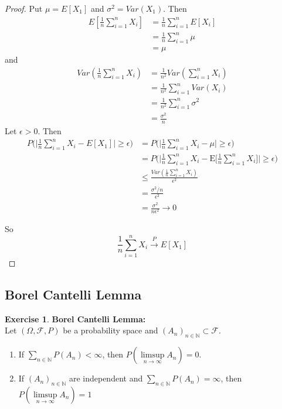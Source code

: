 \documentclass[12pt]{amsart}
\theoremstyle{definition}
\newtheorem{ex}[definition]{Exercise}
\newcommand{\ep}{\epsilon}
\newcommand{\sig}{\sigma}
\newcommand{\Om}{\Omega}
\newcommand{\N}{\mathbb{N}}
\newcommand{\MF}{\mathcal{F}}
\newcommand{\E}{\text{E}}
\newcommand{\limpn}{\limsup \limits_{n \rightarrow \infty}}
\newcommand{\conv}[1]{\xrightarrow{#1}}
\begin{document}
	\begin{proof}
		Put $\mu = E[X_1]$ and $\sig^2 = Var(X_1)$. Then 
		\begin{align*}
			E[\frac{1}{n}\sum_{i=1}^n X_i] 
			&= \frac{1}{n} \sum_{i=1}^nE[X_i] \\
			&= \frac{1}{n} \sum_{i=1}^n \mu \\
			&= \mu
		\end{align*} and 
		\begin{align*}
			Var(\frac{1}{n}\sum_{i=1}^n X_i) 
			&= \frac{1}{n^2} Var(\sum_{i=1}^n X_i) \\
			&= \frac{1}{n^2} \sum_{i=1}^n Var(X_i) \\
			&= \frac{1}{n^2} \sum_{i=1}^n \sig^2 \\
			&= \frac{\sig^2}{n}
		\end{align*}
		Let $\ep >0$. Then 
		\begin{align*}
			P\bigg(\bigg \vert \frac{1}{n} \sum_{i=1}^n X_i - E[X_1] \bigg \vert \geq \ep \bigg) 
			& = P\bigg(\bigg\vert \frac{1}{n} \sum_{i=1}^n X_i - \mu \bigg\vert \geq \ep\bigg) \\
			& = P\bigg(\bigg\vert \frac{1}{n} \sum_{i=1}^n X_i - \E\bigg[\frac{1}{n}\sum_{i=1}^n X_i \bigg] \bigg\vert \geq \ep\bigg) \\ 
			&\leq \frac{Var(\frac{1}{n} \sum_{i=1}^n X_i)}{\ep^2} \\
			& =  \frac{\sig^2 / n}{\ep^2} \\
			&= \frac{\sig^2}{n\ep^2} \rightarrow 0
		\end{align*}
		
		So $$\frac{1}{n}\sum_{i=1}^n X_i \conv{P} E[X_1]$$
	\end{proof}
	
	
	
	
	
	
	
	
	
	
	
	
	
	
	\newpage
	\subsection{Borel Cantelli Lemma} 
	
	\begin{ex}\textbf{Borel Cantelli Lemma:}\\
		Let $(\Om, \MF, P)$ be a probability space and $(A_n)_{n \in \N} \subset \MF$.
		\begin{enumerate}
			\item If $\sum\limits_{n \in \N}P(A_n) < \infty$, then $P(\limpn A_n) = 0$.
			\item If $(A_n)_{n \in \N}$ are independent and $\sum\limits_{n \in \N} P(A_n) = \infty$, then $P( \limpn A_n) = 1$  
		\end{enumerate}
	\end{ex}
	
\end{document}
